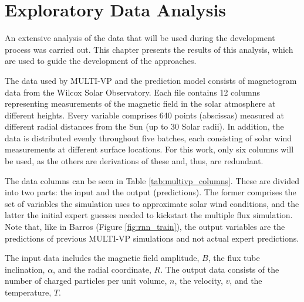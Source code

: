 \chapter{Exploratory Data Analysis}\label{chap:eda}
An extensive analysis of the data that will be used during the development process was carried out. This chapter presents the results of this analysis, which are used to guide the development of the approaches.

The data used by MULTI-VP and the prediction model consists of magnetogram data from the Wilcox Solar Observatory. Each file contains 12 columns representing measurements of the magnetic field in the solar atmosphere at different heights. Every variable comprises 640 points (abscissas) measured at different radial distances from the Sun (up to 30 Solar radii). In addition, the data is distributed evenly throughout five batches, each consisting of solar wind measurements at different surface locations. For this work, only six columns will be used, as the others are derivations of these and, thus, are redundant. 

The data columns can be seen in Table \ref{tab:multivp_columns}. These are divided into two parts: the input and the output (predictions). The former comprises the set of variables the simulation uses to approximate solar wind conditions, and the latter the initial expert guesses needed to kickstart the multiple flux simulation. Note that, like in Barros \cite{barros_InitialConditionEstimation_} (Figure \ref{fig:rnn_train}), the output variables are the predictions of previous MULTI-VP simulations and not actual expert predictions.

The input data includes the magnetic field amplitude, $B$, the flux tube inclination, $\alpha$, and the radial coordinate, $R$. The output data consists of the number of charged particles per unit volume, $n$, the velocity, $v$, and the temperature, $T$.

